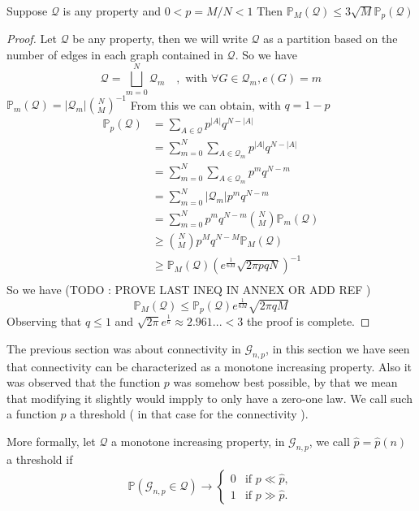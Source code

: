 \begin{theorem}\label{th:linkMP}
	Suppose $\mathcal{Q}$ is any property and $0 < p = M/N< 1$ 
	\newline
	Then $\mathbb{P}_M(\mathcal{Q}) \leq 3 \sqrt{M}\mathbb{P}_p(\mathcal{Q})$
\end{theorem}
\begin{proof}
	Let $\mathcal{Q}$ be any property, then we will write $\mathcal{Q}$ as a partition based on the number of edges in each graph contained in $\mathcal{Q}$.
	\newline
	So we have
	$$\mathcal{Q} = \bigsqcup_{m=0}^{N} \mathcal{Q}_m \quad, \text{ with } \forall G \in \mathcal{Q}_m, e(G) = m$$
	$\mathbb{P}_m(\mathcal{Q}) = |\mathcal{Q}_m| \binom{N}{M}^{-1}$
	From this we can obtain, with $q = 1 - p$
	\begin{align*}
		\mathbb{P}_p(\mathcal{Q})	&= \sum_{A \in \mathcal{Q}} p^{|A|}q^{N-|A|}\\
						&= \sum_{m=0}^{N}\sum_{A \in \mathcal{Q}_m} p^{|A|}q^{N-|A|}\\
						&= \sum_{m=0}^{N}\sum_{A \in \mathcal{Q}_m} p^{m}q^{N-m}\\
						&= \sum_{m=0}^{N}|\mathcal{Q}_m|p^{m}q^{N-m}\\
						&= \sum_{m=0}^N p^mq^{N-m}\binom{N}{M}\mathbb{P}_m(\mathcal{Q}) \\
						&\geq \binom{N}{M}p^Mq^{N-M}\mathbb{P}_M(\mathcal{Q}) \\
						&\geq \mathbb{P}_M(\mathcal{Q})(e^{\frac{1}{6M}}\sqrt{2\pi p q N})^{-1}\\
	\end{align*}
	So we have (TODO : PROVE LAST INEQ IN ANNEX OR ADD REF )
	\begin{equation}
		\mathbb{P}_M(\mathcal{Q}) \leq  \mathbb{P}_p(\mathcal{Q})e^{\frac{1}{6M}}\sqrt{2\pi q M}
	\end{equation}
	Observing that $q \leq 1$ and $\sqrt{2\pi}e^{\frac{1}{6}} \approx 2.961... < 3$ the proof is complete.
\end{proof}
The previous section was about connectivity in $\mathcal{G}_{n,p}$, in this section we have seen that connectivity can be characterized as a monotone increasing property.
Also it was observed that the function $p$ was somehow best possible, by that we mean that modifying it slightly would impply to only have a zero-one law. 
We call such a function $p$ a threshold ( in that case for the connectivity ). 
\newline

More formally, let $\mathcal{Q}$ a monotone increasing property,  in $\mathcal{G}_{n, p}$, we call $\hat{p} = \hat{p}(n)$ a threshold if
\begin{align}
	\mathbb{P}(\mathcal{G}_{n,p} \in \mathcal{Q}) \rightarrow \left\{\begin{array}{rl}
										0 & \text{if } p \ll \hat{p},\\
										1 & \text{if } p \gg \hat{p}.
									 \end{array}
									\right.
\end{align}

